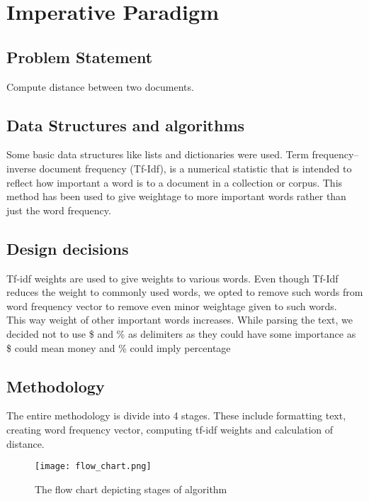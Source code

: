 \chapter{Imperative Paradigm}
\label{ch:p1}

\section{Problem Statement}
\label{sec:pm1}

Compute distance between two documents.

\section{Data Structures and algorithms}

Some basic data structures like lists and dictionaries were used. Term frequency–inverse document frequency (Tf-Idf), is a numerical statistic that is intended to reflect how important a word is to a document in a collection or corpus. This method has been used to give weightage to more important words rather than just the word frequency.

\section{Design decisions}

Tf-idf weights are used to give weights to various words. Even though Tf-Idf reduces the weight to commonly used words, we opted to remove such words from word frequency vector to remove even minor weightage given to such words.\\
\indent This way weight of other important words increases. While parsing the text, we decided not to use \$ and \% as delimiters as they could have some importance as \$ could mean money and \% could imply percentage 


\section{Methodology}

The entire methodology is divide into 4 stages. These include formatting text, creating word frequency vector, computing tf-idf weights and calculation of distance. 

\begin{figure}[H]
	\centering
	\texttt{[image: flow\_chart.png]}\\
	\caption{The flow chart depicting stages of algorithm}
\end{figure}

